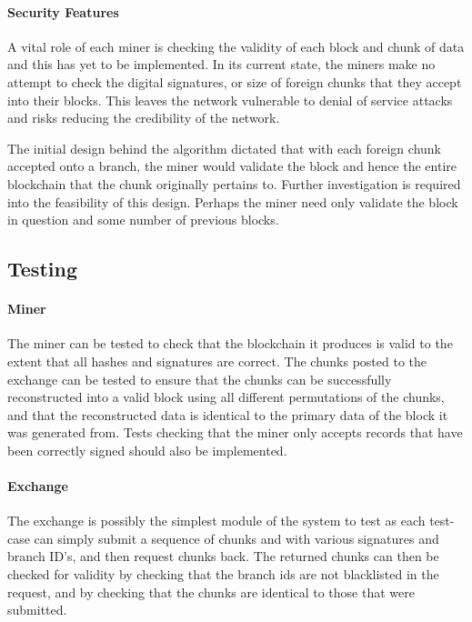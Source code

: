 \documentclass[]{article}
\let\oldparagraph\paragraph
\renewcommand{\paragraph}[1]{\oldparagraph{#1}\mbox{}}
\begin{document}
\hypertarget{header-n127}{%
\paragraph{Security Features}\label{header-n127}}

A vital role of each miner is checking the validity of each block and
chunk of data and this has yet to be implemented. In its current state,
the miners make no attempt to check the digital signatures, or size of
foreign chunks that they accept into their blocks. This leaves the
network vulnerable to denial of service attacks and risks reducing the
credibility of the network.

The initial design behind the algorithm dictated that with each foreign
chunk accepted onto a branch, the miner would validate the block and
hence the entire blockchain that the chunk originally pertains to.
Further investigation is required into the feasibility of this design.
Perhaps the miner need only validate the block in question and some
number of previous blocks.

\hypertarget{header-n130}{%
\subsection{Testing}\label{header-n130}}

\hypertarget{header-n131}{%
\paragraph{Miner}\label{header-n131}}

The miner can be tested to check that the blockchain it produces is
valid to the extent that all hashes and signatures are correct. The
chunks posted to the exchange can be tested to ensure that the chunks
can be successfully reconstructed into a valid block using all different
permutations of the chunks, and that the reconstructed data is identical
to the primary data of the block it was generated from. Tests checking
that the miner only accepts records that have been correctly signed
should also be implemented.

\hypertarget{header-n133}{%
\paragraph{Exchange}\label{header-n133}}

The exchange is possibly the simplest module of the system to test as
each test-case can simply submit a sequence of chunks and with various
signatures and branch ID's, and then request chunks back. The returned
chunks can then be checked for validity by checking that the branch ids
are not blacklisted in the request, and by checking that the chunks are
identical to those that were submitted.
\end{document}
